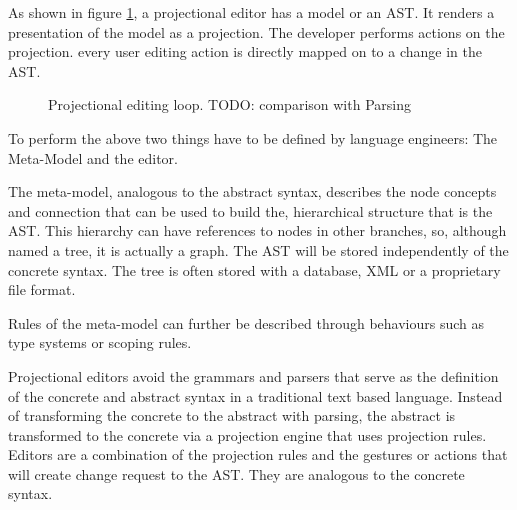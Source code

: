 As shown in figure \ref{fig:projectionalEditing_loop}, a projectional editor has a model or an AST. 
It renders a presentation of the model as a projection. 
The developer performs actions on the projection.
every user editing action is directly mapped on to a change in the AST. 

\begin{figure}[h]
    \centering
    \caption{Projectional editing loop. TODO: comparison with Parsing}
    \label{fig:projectionalEditing_loop}
\end{figure}

To perform the above two things have to be defined by language engineers: The Meta-Model and the editor.

The meta-model, analogous to the abstract syntax, describes the node concepts and connection that can be used to build the, hierarchical structure that is the AST.
This hierarchy can have references to nodes in other branches, so, although named a tree, it is actually a graph.
The AST will be stored independently of the concrete syntax.
The tree is often stored with a database, XML or a proprietary file format.

Rules of the meta-model can further be described through behaviours such as type systems or scoping rules.

Projectional editors avoid the grammars and parsers that serve as the definition of the concrete and abstract syntax in a traditional text based language.
Instead of transforming the concrete to the abstract with parsing, the abstract is transformed to the concrete via a projection engine that uses projection rules.
Editors are a combination of the projection rules and the gestures or actions that will create change request to the AST.
They are analogous to the concrete syntax.

